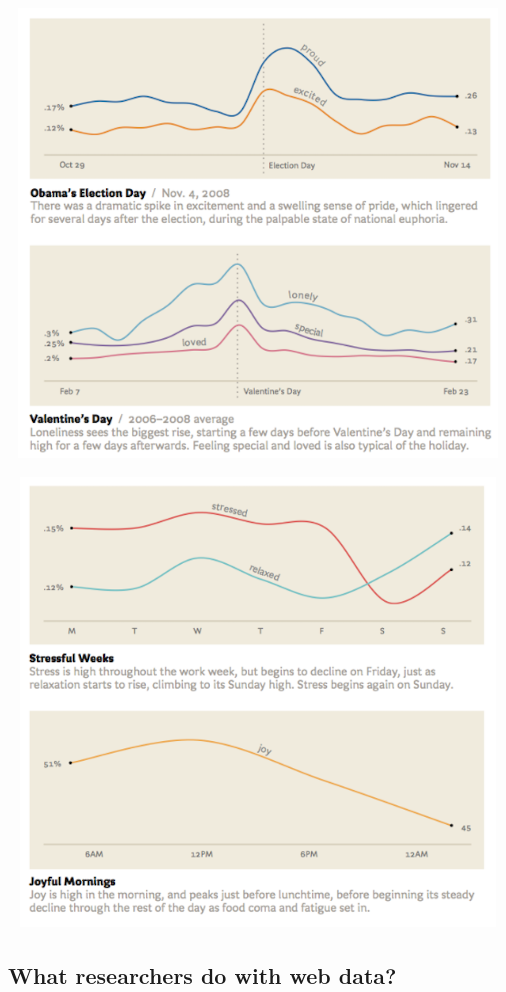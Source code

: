 \includegraphics[width=5.20833in,height=4.68750in]{emotionTS1.png}

\includegraphics[width=5.20833in,height=4.68750in]{emotionTS2.png}

\subsection{What researchers do with web
data?}\label{what-researchers-do-with-web-data}

